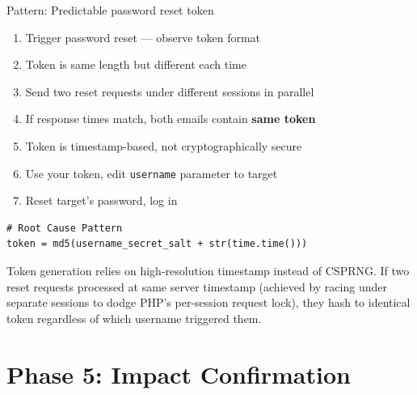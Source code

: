 \documentclass[11pt]{article}
\begin{document}
\begin{labbox}{Pattern: Predictable password reset token}
\begin{enumerate}
    \item Trigger password reset — observe token format
    \item Token is same length but different each time
    \item Send two reset requests under different sessions in parallel
    \item If response times match, both emails contain \textbf{same token}
    \item Token is timestamp-based, not cryptographically secure
    \item Use your token, edit \texttt{username} parameter to target
    \item Reset target's password, log in
\end{enumerate}
\end{labbox}

\begin{lstlisting}[style=code]
# Root Cause Pattern
token = md5(username_secret_salt + str(time.time()))
\end{lstlisting}

\begin{causebox}
Token generation relies on high-resolution timestamp instead of CSPRNG. If two reset requests processed at same server timestamp (achieved by racing under separate sessions to dodge PHP's per-session request lock), they hash to identical token regardless of which username triggered them.
\end{causebox}

\section{Phase 5: Impact Confirmation}
\end{document}
